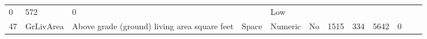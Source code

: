 \documentclass[11pt]{article}
\begin{document}
\begin{longtable}[]{@{}llllllllllll@{}}
\begin{minipage}[t]{0.04\columnwidth}
0\strut
\end{minipage} & \begin{minipage}[t]{0.04\columnwidth}\raggedright\strut
572\strut
\end{minipage} & \begin{minipage}[t]{0.04\columnwidth}\raggedright\strut
0\strut
\end{minipage} & \begin{minipage}[t]{0.04\columnwidth}\raggedright\strut
\strut
\end{minipage} & \begin{minipage}[t]{0.04\columnwidth}\raggedright\strut
Low\strut
\end{minipage}\tabularnewline
\begin{minipage}[t]{0.04\columnwidth}\raggedright\strut
47\strut
\end{minipage} & \begin{minipage}[t]{0.04\columnwidth}\raggedright\strut
GrLivArea\strut
\end{minipage} & \begin{minipage}[t]{0.04\columnwidth}\raggedright\strut
Above grade (ground) living area square feet\strut
\end{minipage} & \begin{minipage}[t]{0.04\columnwidth}\raggedright\strut
Space\strut
\end{minipage} & \begin{minipage}[t]{0.04\columnwidth}\raggedright\strut
Numeric\strut
\end{minipage} & \begin{minipage}[t]{0.04\columnwidth}\raggedright\strut
No\strut
\end{minipage} & \begin{minipage}[t]{0.04\columnwidth}\raggedright\strut
1515\strut
\end{minipage} & \begin{minipage}[t]{0.04\columnwidth}\raggedright\strut
334\strut
\end{minipage} & \begin{minipage}[t]{0.04\columnwidth}\raggedright\strut
5642\strut
\end{minipage} & \begin{minipage}[t]{0.04\columnwidth}\raggedright\strut
0\strut
\end{minipage} & \begin{minipage}[t]{0.04\columnwidth}\raggedright\strut
\strut
\end{minipage} & \begin{minipage}[t]{0.04\columnwidth}\raggedright\strut

\end{minipage}
\end{longtable}
\end{document}
